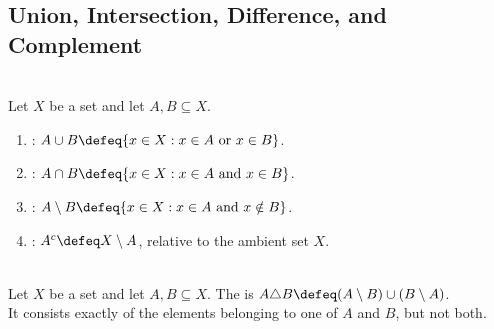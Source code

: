 \subsection{Union, Intersection, Difference, and Complement}

\begin{definition} \label{def:analysis-sets-and-operations} \\
Let $X$ be a set and let $A,B\subseteq X$.
\begin{enumerate}[label=(\roman*)]
\setlength{\itemsep}{0pt}
\item {}: $A\cup B\defeq\{x\in X:x\in A\text{ or }x\in B\}$.
\item {}: $A\cap B\defeq\{x\in X:x\in A\text{ and }x\in B\}$.
\item {}: $A\setminus B\defeq\{x\in X:x\in A\text{ and }x\notin B\}$.
\item {}: $A^c\defeq X\setminus A$, relative to the ambient set $X$.
\end{enumerate}
\end{definition}

\begin{definition} \label{def:symmetric-difference-of-events-and-sets} \\
Let $X$ be a set and let $A,B\subseteq X$.
The  is $A\triangle B\defeq(A\setminus B)\cup(B\setminus A)$.\\
It consists exactly of the elements belonging to one of $A$ and $B$, but not both.
\end{definition}

